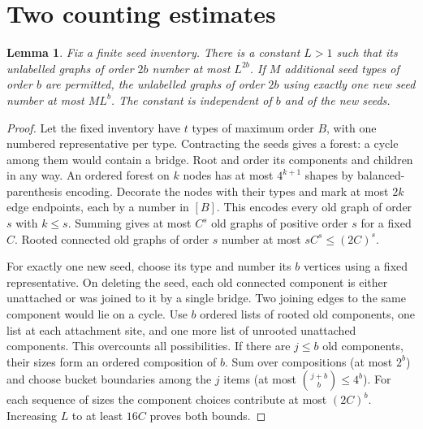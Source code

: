 \documentclass[11pt]{article}
\newtheorem{lemma}[theorem]{Lemma}
\begin{document}
\section{Two counting estimates}
\begin{lemma}\label{old}
Fix a finite seed inventory. There is a constant $L>1$ such that its unlabelled graphs of order $2b$ number at most $L^{2b}$. If $M$ additional seed types of order $b$ are permitted, the unlabelled graphs of order $2b$ using exactly one new seed number at most $ML^b$. The constant is independent of $b$ and of the new seeds.
\end{lemma}
\begin{proof}
Let the fixed inventory have $t$ types of maximum order $B$, with one numbered representative per type. Contracting the seeds gives a forest: a cycle among them would contain a bridge. Root and order its components and children in any way. An ordered forest on $k$ nodes has at most $4^{k+1}$ shapes by balanced-parenthesis encoding. Decorate the nodes with their types and mark at most $2k$ edge endpoints, each by a number in $[B]$. This encodes every old graph of order $s$ with $k\le s$. Summing gives at most $C^s$ old graphs of positive order $s$ for a fixed $C$. Rooted connected old graphs of order $s$ number at most $s C^s\le (2C)^s$.

For exactly one new seed, choose its type and number its $b$ vertices using a fixed representative. On deleting the seed, each old connected component is either unattached or was joined to it by a single bridge. Two joining edges to the same component would lie on a cycle. Use $b$ ordered lists of rooted old components, one list at each attachment site, and one more list of unrooted unattached components. This overcounts all possibilities. If there are $j\le b$ old components, their sizes form an ordered composition of $b$. Sum over compositions (at most $2^b$) and choose bucket boundaries among the $j$ items (at most $\binom{j+b}{b}\le4^b$). For each sequence of sizes the component choices contribute at most $(2C)^b$. Increasing $L$ to at least $16C$ proves both bounds.
\end{proof}
\end{document}
